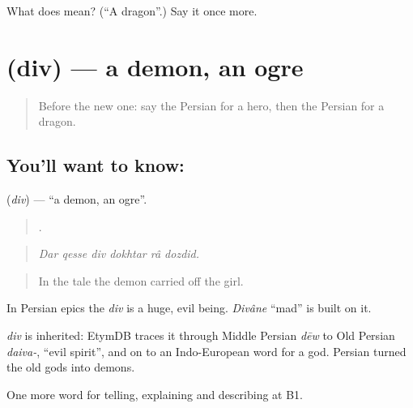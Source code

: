 \begin{tcolorbox}[breakable,colback=teal!4,colframe=teal!35!black,title={Before you move on}]
What does  mean? (\textquotedblleft{}A dragon\textquotedblright{}.) Say it once more.
\end{tcolorbox}
\section[\texorpdfstring{\fa{دیو} (div)}{دیو (div)}]{ (div) — a demon, an ogre}

\label{lesson:FA-C347-div}



\begin{quote}
Before the new one: say the Persian for a hero, then the Persian for a dragon.
\end{quote}

\subsection*{You'll want to know: }
\textbf{} (\emph{div}) — \textquotedblleft{}a demon, an ogre\textquotedblright{}.

\begin{quote}
     .
\end{quote}

\begin{quote}
\emph{Dar qesse div dokhtar râ dozdid.}
\end{quote}

\begin{quote}
In the tale the demon carried off the girl.
\end{quote}

In Persian epics the \emph{div} is a huge, evil being. \emph{Divâne} \textquotedblleft{}mad\textquotedblright{} is built on it.

\begin{cousinweb}
\emph{div} is inherited: EtymDB traces it through Middle Persian \emph{dēw} to Old Persian \emph{daiva-}, \textquotedblleft{}evil spirit\textquotedblright{}, and on to an Indo-European word for a god. Persian turned the old gods into demons.
\end{cousinweb}

\begin{grammarlens}[title={What you've built}]
One more word for telling, explaining and describing at B1.
\end{grammarlens}

